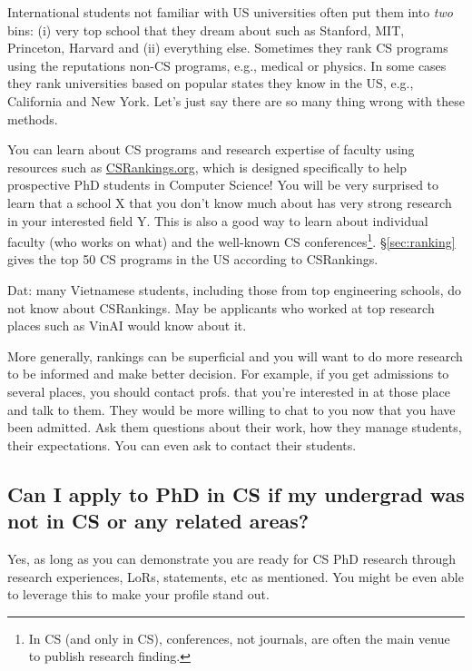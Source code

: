 \documentclass[11pt]{article}
\newenvironment{commentbox}{
 \small
    \begin{cbox}
 }{
   \end{cbox}
}
\begin{document}
International students not familiar with US universities often put them into \emph{two} bins:  (i) very top school that they dream about such as Stanford, MIT, Princeton, Harvard and (ii) everything else.  Sometimes they rank CS programs using the reputations non-CS programs, e.g., medical or physics.
In some cases they rank universities based on popular states they know in the US, e.g., California and New York.  Let's just say there are so many thing wrong with these methods.

You can learn about CS programs and research expertise of faculty using resources such as \href{https://csrankings.org}{CSRankings.org}, which is designed specifically to help prospective PhD students in Computer Science!  You will be very surprised to learn that a school X that you don't know much about has very strong research in your interested field Y. This is also a good way to learn about individual faculty (who works on what) and the well-known CS conferences\footnote{In CS (and only in CS), conferences, not journals, are often the main venue to publish research finding.}. \S\ref{sec:ranking} gives the top 50 CS programs in the US according to CSRankings.
\begin{commentbox}
    Dat: many Vietnamese students, including those from top engineering schools, do not know about CSRankings.  May be applicants who worked at top research places such as VinAI would know about it.
\end{commentbox}

More generally, rankings can be superficial and you will want to do more research to be informed and make better decision. For example, if you get admissions to several places, you should contact profs. that you're interested in at those place and talk to them. They would be more willing to chat to you now that you have been admitted.  Ask them questions about their work, how they manage students, their expectations. You can even ask to contact their students.


\subsection{Can I apply to PhD in CS if my undergrad was not in CS or any related areas?}

Yes, as long as you can demonstrate you are ready for CS PhD research through research experiences, LoRs, statements, etc as mentioned. You might be even able to leverage this to make your profile stand out.
\end{document}
